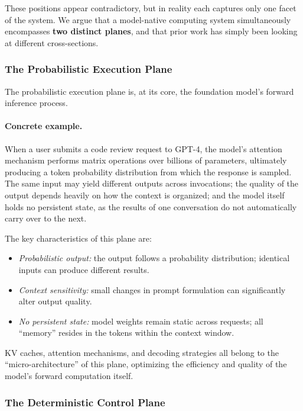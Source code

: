 These positions appear contradictory, but in reality each captures only one facet of the system.
We argue that a model-native computing system simultaneously encompasses \textbf{two distinct planes}, and that prior work has simply been looking at different cross-sections.

\subsubsection{The Probabilistic Execution Plane}

The probabilistic execution plane is, at its core, the foundation model's forward inference process.

\paragraph{Concrete example.}
When a user submits a code review request to GPT-4, the model's attention mechanism performs matrix operations over billions of parameters, ultimately producing a token probability distribution from which the response is sampled.
The same input may yield different outputs across invocations; the quality of the output depends heavily on how the context is organized; and the model itself holds no persistent state, as the results of one conversation do not automatically carry over to the next.

The key characteristics of this plane are:
\begin{itemize}[nosep]
\item \textit{Probabilistic output:} the output follows a probability distribution; identical inputs can produce different results.
\item \textit{Context sensitivity:} small changes in prompt formulation can significantly alter output quality.
\item \textit{No persistent state:} model weights remain static across requests; all ``memory'' resides in the tokens within the context window.
\end{itemize}

KV caches, attention mechanisms, and decoding strategies all belong to the ``micro-architecture'' of this plane, optimizing the efficiency and quality of the model's forward computation itself.

\subsubsection{The Deterministic Control Plane}

